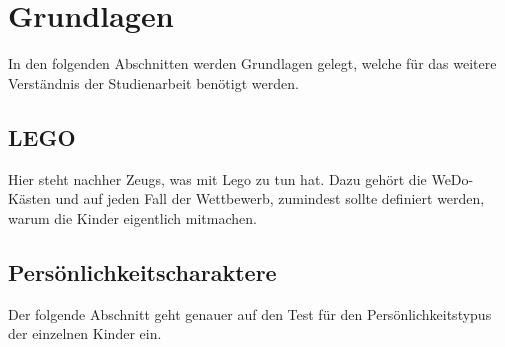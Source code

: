 \chapter{Grundlagen}

In den folgenden Abschnitten werden Grundlagen gelegt, welche für das weitere Verständnis der Studienarbeit benötigt werden.

\section{LEGO}

Hier steht nachher Zeugs, was mit Lego zu tun hat. Dazu gehört die WeDo-Kästen und auf jeden Fall der Wettbewerb, zumindest sollte definiert werden, warum die Kinder eigentlich mitmachen.

\section{Persönlichkeitscharaktere}

Der folgende Abschnitt geht genauer auf den Test für den Persönlichkeitstypus der einzelnen Kinder ein.

